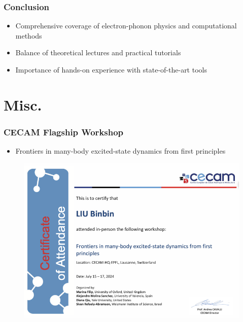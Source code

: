 \documentclass{CustomBeamer}
\begin{document}
    \begin{frame}
        \frametitle{Conclusion}
        \begin{itemize}
            \item Comprehensive coverage of electron-phonon physics and computational methods
            \item Balance of theoretical lectures and practical tutorials
            \item Importance of hands-on experience with state-of-the-art tools
        \end{itemize}
        \end{frame}

        

    \section*{Misc.}

    \begin{frame}
        \frametitle{CECAM Flagship Workshop}
        \begin{itemize}
        \item      Frontiers in many-body excited-state dynamics from first principles
        \end{itemize}
    \begin{figure}
        \centering
        \includegraphics[width=0.6\linewidth]{cecam.png}
    \end{figure}
    \end{frame}
\end{document}
